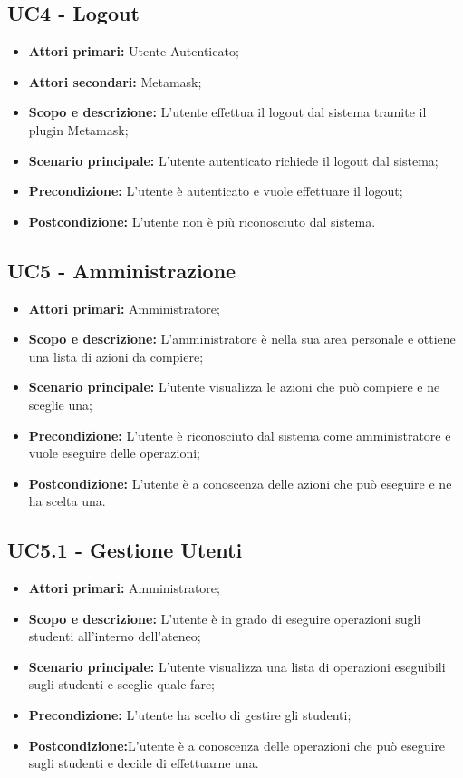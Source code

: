 \documentclass[AnalisiDeiRequisiti.tex]{subfiles}
\begin{document}
\subsection{UC4 - Logout}
\begin{itemize}
	\item \textbf{Attori primari:} Utente Autenticato;
	\item \textbf{Attori secondari:} Metamask;
	\item \textbf{Scopo e descrizione:} L'utente effettua il logout dal sistema tramite il plugin Metamask;
	\item \textbf{Scenario principale:} L'utente autenticato richiede il logout dal sistema;
	\item \textbf{Precondizione:} L'utente è autenticato e vuole effettuare il logout;
	\item \textbf{Postcondizione:} L'utente non è più riconosciuto dal sistema.
\end{itemize}
\subsection{UC5 - Amministrazione}
\begin{itemize}
	\item \textbf{Attori primari:} Amministratore;
	\item \textbf{Scopo e descrizione:} L'amministratore è nella sua area personale e ottiene una lista di azioni da compiere;
	\item \textbf{Scenario principale:} L'utente visualizza le azioni che può compiere e ne sceglie una; 
	\item \textbf{Precondizione:} L'utente è riconosciuto dal sistema come amministratore e vuole eseguire delle operazioni; 
	\item \textbf{Postcondizione:} L'utente è a conoscenza delle azioni che può eseguire e ne ha scelta una.
\end{itemize}
\subsection{UC5.1 - Gestione Utenti}
\begin{itemize}
	\item \textbf{Attori primari:} Amministratore;
	\item \textbf{Scopo e descrizione:} L'utente è in grado di eseguire operazioni sugli studenti all'interno dell'ateneo;
	\item \textbf{Scenario principale:} L'utente visualizza una lista di operazioni eseguibili sugli studenti e sceglie quale fare;
	\item \textbf{Precondizione:} L'utente ha scelto di gestire gli studenti; 
	\item \textbf{Postcondizione:}L'utente è a conoscenza delle operazioni che può eseguire sugli studenti e decide di effettuarne una.
\end{itemize}
\end{document}
